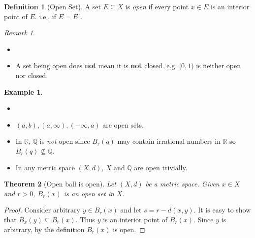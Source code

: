 \documentclass[12pt, lettersize]{book}
\theoremstyle{plain}
\newtheorem{thm}{Theorem}[section]
\theoremstyle{definition}
\newtheorem{dfn}[thm]{Definition}
\newtheorem*{eg}{Example}
\theoremstyle{remark}
\newtheorem*{rem}{Remark}
\newcommand{\R}{\mathbb{R}}
\newcommand{\Q}{\mathbb{Q}}
\begin{document}
		\begin{dfn}[Open Set]
			A set $E\subseteq X$ is \emph{open} if every point $x\in E$ is an interior point of $E$. i.e., if $E=E^\circ$.	
		\end{dfn}
		\begin{rem}
		\begin{itemize}
			\item[]
 
			\item A set being open does \textbf{not} mean it is \textbf{not} closed. e.g. $[0,1)$ is neither open nor closed.
		\end{itemize}
		\end{rem}
		\begin{eg}
			\begin{itemize}
				\item[]
				\item $(a,b),(a,\infty),(-\infty,a)$ are open sets.
	 			\item In $\R$, $\Q$ is \emph{not} open since $B_r(q)$ may contain irrational numbers in $\R$ so $B_r(q)\nsubseteq\Q$.
		        \item In any metric space $(X,d)$, $X$ and $\Q$ are open trivially.
			\end{itemize}
		\end{eg}
		
		\begin{thm}[Open ball is open]
		Let $(X,d)$ be a metric space. Given $x\in X$ and $r>0$, $B_r(x)$ is an open set in $X$.
		\end{thm}
		\begin{proof}
		Consider arbitrary $y\in B_r(x)$ and let $s=r-d(x,y)$. It is easy to show that $B_x(y)\subseteq B_r(x)$. Thus $y$ is an interior point of $B_r(x)$. Since $y$ is arbitrary, by the definition $B_r(x)$ is open.
		\end{proof}
		
\end{document}

